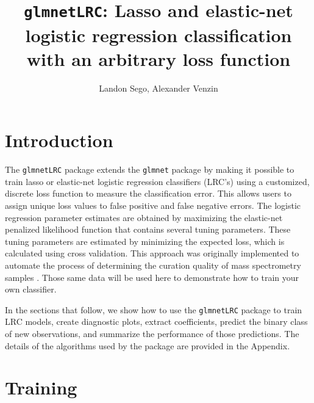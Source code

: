 \documentclass{article}
\begin{document}
 


\title{{\tt glmnetLRC}: Lasso and elastic-net logistic regression classification with an arbitrary loss function\\}
\author{Landon Sego, Alexander Venzin}
\maketitle

\section{Introduction}

The {\tt glmnetLRC} package extends the {\tt glmnet} package by making it possible to train lasso or elastic-net logistic 
regression classifiers (LRC's) using a customized, discrete loss function to measure the classification error.  
This allows users to assign unique 
loss values to false positive and false negative errors. The logistic regression parameter
estimates are obtained by maximizing the elastic-net penalized likelihood function that contains several tuning parameters. These
tuning parameters are estimated by minimizing the expected loss, which is calculated using cross validation.
This approach was originally implemented to automate the
process of determining the curation quality of mass spectrometry samples \cite{Amidan}. Those same data
will be used here to demonstrate how to train your own classifier.

In the sections that follow, we show how to use the {\tt glmnetLRC} package to train LRC models, create diagnostic plots,
extract coefficients, predict the binary class of new observations, and summarize the performance of those
predictions. The details of the algorithms used by the package are provided in the Appendix.

\section{Training}
\end{document}
